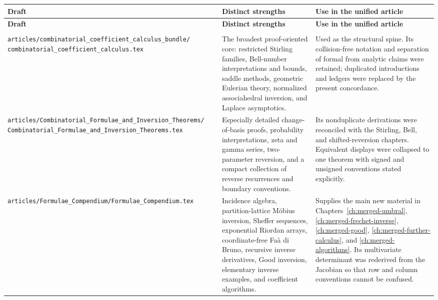 \documentclass[11pt,a4paper,oneside,openany]{book}
\theoremstyle{definition}
\theoremstyle{remark}
\begin{document}
\renewcommand{\arraystretch}{1.15}
\begin{longtable}{>{\raggedright\arraybackslash}p{}
                  >{\raggedright\arraybackslash}p{}
                  >{\raggedright\arraybackslash}p{}}
\toprule
\textbf{Draft} & \textbf{Distinct strengths} & \textbf{Use in the unified article}\\
\midrule
\endfirsthead
\toprule
\textbf{Draft} & \textbf{Distinct strengths} & \textbf{Use in the unified article}\\
\midrule
\endhead
\midrule
\multicolumn{3}{r}{\small Continued on the next page}\\
\endfoot
\bottomrule
\endlastfoot

\nolinkurl{articles/combinatorial_coefficient_calculus_bundle/}
\nolinkurl{combinatorial_coefficient_calculus.tex}
& The broadest proof-oriented core: restricted Stirling families, Bell-number
  interpretations and bounds, saddle methods, geometric Eulerian theory,
  normalized associahedral inversion, and Laplace asymptotics.
& Used as the structural spine.  Its collision-free notation and separation of
  formal from analytic claims were retained; duplicated introductions and ledgers
  were replaced by the present concordance.\\[1ex]

\nolinkurl{articles/Combinatorial_Formulae_and_Inversion_Theorems/}
\nolinkurl{Combinatorial_Formulae_and_Inversion_Theorems.tex}
& Especially detailed change-of-basis proofs, probability interpretations,
  zeta and gamma series, two-parameter reversion, and a compact collection of
  reverse recurrences and boundary conventions.
& Its nonduplicate derivations were reconciled with the Stirling, Bell, and
  shifted-reversion chapters.  Equivalent displays were collapsed to one theorem
  with signed and unsigned conventions stated explicitly.\\[1ex]

\nolinkurl{articles/Formulae_Compendium/Formulae_Compendium.tex}
& Incidence algebra, partition-lattice M\"obius inversion, Sheffer sequences,
  exponential Riordan arrays, coordinate-free Fa\`a di Bruno, recursive inverse
  derivatives, Good inversion, elementary inverse examples, and coefficient
  algorithms.
& Supplies the main new material in
  Chapters~\ref{ch:merged-umbral}, \ref{ch:merged-frechet-inverse},
  \ref{ch:merged-good}, \ref{ch:merged-further-calculus}, and
  \ref{ch:merged-algorithms}.  Its multivariate determinant was rederived from
  the Jacobian so that row and column conventions cannot be confused.\\[1ex]


\end{longtable}
\end{document}
